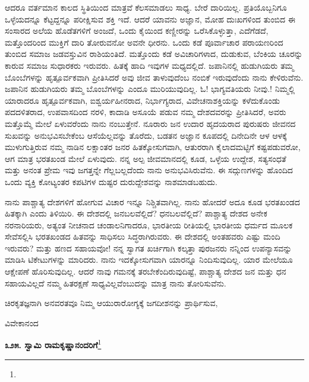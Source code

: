 ಆದರೂ ವರ್ತಮಾನ ಕಾಲದ ಸ್ಥಿತಿಯಿಂದ ಮಾತ್ರವೆ ಕೆಲಸಮಾಡಲು ಸಾಧ್ಯ. ಬೇರೆ ದಾರಿಯಿಲ್ಲ. ಪ್ರತಿಯೊಬ್ಬನಿಗೂ ಒಳ್ಳೆಯದನ್ನೂ ಕೆಟ್ಟದ್ದನ್ನೂ ಪರೀಕ್ಷಿಸುವ ಶಕ್ತಿ ಇದೆ. ಆದರೆ ಯಾವನು ಅಜ್ಞಾನ, ಮೋಹ ದುಃಖಗಳಿಂದ ತುಂಬಿದ ಈ ಸಂಸಾರದ ಅಲೆಯ ಹೊಡೆತಗಳಿಗೆ ಅಂಜದೆ, ಒಂದು ಕೈಯಿಂದ ಕಣ್ಣೀರನ್ನು ಒರೆಸಿಕೊಳ್ಳುತ್ತಾ, ಎದೆಗೆಡದೆ, ಮತ್ತೊಂದರಿಂದ ಮುಕ್ತಿಗೆ ದಾರಿ ತೋರುವನೋ ಅವನೇ ಧೀರನು. ಒಂದು ಕಡೆ ಪೂರ್ವಾಚಾರ ಪರಾಯಣರಿಂದ ತುಂಬಿದ ಸಮಾಜ ಜಡವಸ್ತುವಿನ ರಾಶಿಯಂತಿದೆ. ಮತ್ತೊಂದು ಕಡೆ ಅವಿಚಾರಿಗಳಾದ, ದುಡುಕುವ, ಬೆಂಕಿಯ ಚೂರನ್ನು ಕಾರುವ ಸಮಾಜ ಸುಧಾರಕರು ಇರುವರು. ಹಿತಕ್ಕೆ ಹಾದಿ ಇವುಗಳ ಮಧ್ಯದಲ್ಲಿದೆ. ಜಪಾನಿನಲ್ಲಿ ಹುಡುಗಿಯರು ತಮ್ಮ ಬೊಂಬೆಗಳನ್ನು ಹೃತ್ಪೂರ್ವಕವಾಗಿ ಪ್ರೀತಿಸಿದರೆ ಅವು ಜೀವ ತಾಳುವುದೆಂಬ ನಂಬಿಕೆ ಇರುವುದೆಂದು ನಾನು ಕೇಳಿರುವೆನು. ಜಪಾನಿನ ಹುಡುಗಿಯರು ತಮ್ಮ ಬೊಂಬೆಗಳನ್ನು ಎಂದೂ ಮುರಿಯುವುದಿಲ್ಲ. ಓ! ಭಾಗ್ಯವತಿಯರು ನೀವು.! ನಿಮ್ಮಲ್ಲಿ ಯಾರಾದರೂ ಹೃತ್ಪೂರ್ವಕವಾಗಿ, ಐಶ್ವರ್ಯಹೀನರಾದ, ನಿರ್ಭಾಗ್ಯರಾದ, ವಿವೇಚನಾಶಕ್ತಿಯನ್ನು ಕಳೆದುಕೊಂಡು ಪದದಳಿತರಾದ, ಉಪವಾಸದಿಂದ ನರಳಿ, ಕಾದಾಡಿ ಅಸೂಯೆ ಪಡುವ ನಮ್ಮ ದೇಶದವರನ್ನು ಪ್ರೀತಿಸಿದರೆ, ಅವರು ಮತ್ತೊಮ್ಮೆ ಮೇಲೆ ಏಳುವರೆಂದು ನಾನು ನಂಬುತ್ತೇನೆ. ನೂರಾರು ಜನ ಉದಾರ ಹೃದಯರಾದ ಪುರುಷರು ಜೀವನದ ಸುಖವನ್ನು ಅನುಭವಿಸಬೇಕೆಂಬ ಆಸೆಯೆಲ್ಲವನ್ನು ತೊರೆದು, ಬಡತನ ಅಜ್ಞಾನ ಕೂಪದಲ್ಲಿ ದಿನೇದಿನೇ ಆಳ ಆಳಕ್ಕೆ ಮುಳುಗುತ್ತಿರುವ ನಮ್ಮ ನಾಡಿನ ಲಕ್ಷಾಂತರ ಜನರ ಹಿತಕ್ಕೋಸುಗವಾಗಿ, ಆತುರರಾಗಿ ಕೈಲಾದಮಟ್ಟಿಗೆ ಕಷ್ಟಪಡುವರೋ, ಆಗ ಮಾತ್ರ ಭರತಖಂಡ ಮೇಲೆ ಏಳುವುದು. ನನ್ನ ಅಲ್ಪ ಜೀವಮಾನದಲ್ಲಿ ಕೂಡ, ಒಳ್ಳೆಯ ಉದ್ದೇಶ, ಸತ್ಯಸಂಧತೆ ಮತ್ತು ಅನಂತ ಪ್ರೇಮ ಇವು ಜಗತ್ತನ್ನೇ ಗೆಲ್ಲಬಲ್ಲದೆಂದು ನಾನು ಅನುಭವಿಸಿರುವೆನು. ಈ ಸದ್ಗುಣಗಳನ್ನು ಹೊಂದಿದ ಒಂದು ವ್ಯಕ್ತಿ ಕೋಟ್ಯಂತರ ಕಪಟಿಗಳ ದುಷ್ಟರ ದುರುದ್ದೇಶವನ್ನು ನಾಶಮಾಡಬಹುದು.

ನಾನು ಪಾಶ್ಚಾತ್ಯ ದೇಶಗಳಿಗೆ ಹೋಗುವ ವಿಚಾರ ಇನ್ನೂ ನಿಶ್ಚಿತವಾಗಿಲ್ಲ. ನಾನು ಹೋದರೆ ಅದೂ ಕೂಡ ಭರತಖಂಡದ ಹಿತಕ್ಕಾಗಿ ಎಂದು ತಿಳಿಯಿರಿ. ಈ ದೇಶದಲ್ಲಿ ಜನಬಲವೆಲ್ಲಿದೆ? ಧನಬಲವೆಲ್ಲಿದೆ? ಪಾಶ್ಚಾತ್ಯ ದೇಶದ ಅನೇಕ ನರನಾರಿಯರು, ಅತ್ಯಂತ ನೀಚನಾದ ಚಂಡಾಲನಿಗಾದರೂ, ಭಾರತೀಯ ರೀತಿಯಲ್ಲಿ ಭಾರತೀಯ ಧರ್ಮದ ಮೂಲಕ ಸೇವೆಸಲ್ಲಿಸಿ ಭರತಖಂಡದ ಹಿತವನ್ನು ಸಾಧಿಸಲು ಸಿದ್ಧರಾಗಿರುವರು. ಈ ದೇಶದಲ್ಲಿ ಅಂತಹವರು ಎಷ್ಟು ಮಂದಿ ಇರುವರು? ಮತ್ತು ಹಣದ ಸಹಾಯವೋ! ನನ್ನ ಸ್ವಾಗತ ಖರ್ಚಿಗಾಗಿ ಕಲ್ಕತ್ತಾ ಪುರಜನರು ನನ್ನಿಂದ ಉಪನ್ಯಾಸವನ್ನು ಮಾಡಿಸಿ ಟಿಕೇಟುಗಳನ್ನು ಮಾರಿದರು. ನಾನು ಇದಕ್ಕೋಸುಗವಾಗಿ ಯಾರನ್ನೂ ನಿಂದಿಸುವುದಿಲ್ಲ. ಯಾರ ಮೇಲೆಯೂ ಆಕ್ಷೇಪಣೆ ಹೊರಿಸುವುದಿಲ್ಲ. ಆದರೆ ನಾವು ಗಮನಕ್ಕೆ ತರಬೇಕೆಂದಿರುವುದಿಷ್ಟೆ, ಪಾಶ್ಚಾತ್ಯ ದೇಶದ ಜನ ಮತ್ತು ಧನ ಸಹಾಯವಿಲ್ಲದೆ ನಮ್ಮ ಹಿತರಕ್ಷಣೆ ಸಾಧ್ಯವಿಲ್ಲವೆಂಬುದನ್ನು ಮಾತ್ರ ನಾನು ತೋರಿಸುವೆನು.

ಚಿರಕೃತಜ್ಞನಾಗಿ ಅನವರತವೂ ನಿಮ್ಮ ಆಯುರಾರೋಗ್ಯಕ್ಕೆ ಜಗದೀಶನನ್ನು ಪ್ರಾರ್ಥಿಸುವ,

\vspace{-0.5cm}

{\flushright
ವಿವೇಕಾನಂದ\par}

\begin{center}
\textbf{೩೨೫. ಸ್ವಾಮಿ ರಾಮಕೃಷ್ಣಾನಂದರಿಗೆ}\footnote{}
\end{center}

